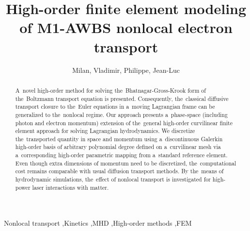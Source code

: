 \documentclass[review]{elsarticle}
\begin{document}
\begin{frontmatter}

\title{High-order finite element modeling of M1-AWBS nonlocal electron transport}

\author[celiaaddress]{Milan, Vladimir, Philippe, Jean-Luc}
\address[celiaaddress]{Universit\'{e} de Bordeaux - CNRS - CEA, CELIA, UMR 5107, F-33405 Talence, France}


\begin{abstract}
A~novel high-order method for solving the~Bhatnagar-Gross-Krook form of 
the~Boltzmann transport equation is presented.  
Consequently, the~classical diffusive transport closure to the~Euler equations 
in a~moving Lagrangian frame can be generalized to the~nonlocal regime. 
Our approach presents a~phase-space (including photon and electron momentum) 
extension of the~general high-order curvilinear finite element approach 
for solving Lagrangian hydrodynamics. 
We discretize the~transported quantity in space and momentum using 
a~discontinuous Galerkin high-order basis of arbitrary polynomial degree 
defined on a~curvilinear mesh via a~corresponding high-order parametric 
mapping from a~standard reference element. Even though extra dimensions of 
momentum need to be discretized, the~computational cost remains comparable 
with usual diffusion transport methods. 
By the~means of hydrodynamic simulations, the~effect of nonlocal transport is 
investigated for high-power laser interactions with matter. 
\end{abstract}

\begin{keyword}
Nonlocal transport \sep Kinetics \sep MHD \sep High-order methods \sep FEM
\end{keyword}


\end{frontmatter}
\end{document}
